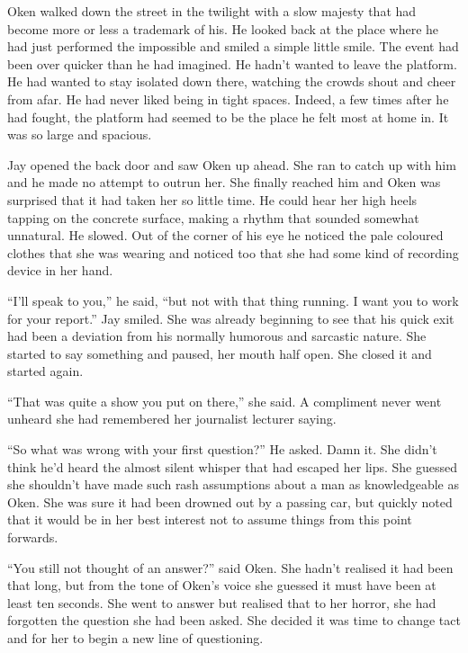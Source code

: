 \thoughtbreak

Oken walked down the street in the twilight with a slow majesty that had become more or less a trademark of his. He looked back at the place where he had just performed the impossible and smiled a simple little smile. The event had been over quicker than he had imagined. He hadn't wanted to leave the platform. He had wanted to stay isolated down there, watching the crowds shout and cheer from afar. He had never liked being in tight spaces. Indeed, a few times after he had fought, the platform had seemed to be the place he felt most at home in. It was so large and spacious.

Jay opened the back door and saw Oken up ahead. She ran to catch up with him and he made no attempt to outrun her. She finally reached him and Oken was surprised that it had taken her so little time. He could hear her high heels tapping on the concrete surface, making a rhythm that sounded somewhat unnatural. He slowed. Out of the corner of his eye he noticed the pale coloured clothes that she was wearing and noticed too that she had some kind of recording device in her hand.

``I'll speak to you,'' he said, ``but not with that thing running. I want you to work for your report.'' Jay smiled. She was already beginning to see that his quick exit had been a deviation from his normally humorous and sarcastic nature. She started to say something and paused, her mouth half open. She closed it and started again.

``That was quite a show you put on there,'' she said. A compliment never went unheard she had remembered her journalist lecturer saying.

``So what was wrong with your first question?'' He asked. Damn it. She didn't think he'd heard the almost silent whisper that had escaped her lips. She guessed she shouldn't have made such rash assumptions about a man as knowledgeable as Oken. She was sure it had been drowned out by a passing car, but quickly noted that it would be in her best interest not to assume things from this point forwards.

``You still not thought of an answer?'' said Oken. She hadn't realised it had been that long, but from the tone of Oken's voice she guessed it must have been at least ten seconds. She went to answer but realised that to her horror, she had forgotten the question she had been asked. She decided it was time to change tact and for her to begin a new line of questioning.

